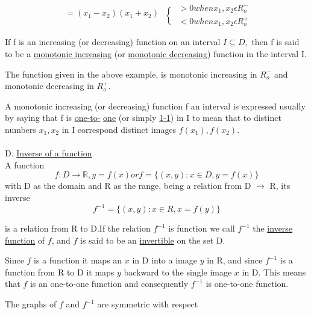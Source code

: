 \documentclass[11pt]{amsbook}
\begin{document}
\[ \left. \begin{array}{ll}
=(x_{1}-x_{2})(x_{1}+x_{2})\\
\end{array} \right \{
\begin{array}{ll}
>0   when  x_{1}, x_{2}\epsilon R_{o}^{-}\\

<0 when x_{1}, x_{2}\epsilon R_{o}^{+}
\end{array} \]

If f is an increasing (or decreasing) function on an  interval $I\subseteq D,$ then f is said to be a \underline{monotonic increasing} (or \underline{monotonic decreasing}) function in the interval I.


The function given in the above example, is monotonic increasing in $R_{o}^{-}$ and monotonic decreasing in $R_{o}^{+}$.


A monotonic increasing (or decreasing) function f an interval is expressed usually by saying that f is \underline{one-to-} \underline{one} (or simply \underline{1-1}) in I to mean that to distinct numbers $x_{1},x_{2}$ in I correspond distinct images $f(x_{1}), f(x_{2})$.\\
\\

D. \underline{Inverse of a function}\\

A function
\begin{equation}
f:D \rightarrow \mathbb{R}, y=f(x) or f=\{(x,y): x \in D, y=f(x)\} 
\end{equation}
with D as the domain and R as the range, being a relation from D $\rightarrow$ R, its inverse
\begin{equation}
f^{-1} = \{(x,y): x \in R, x=f(y)\}
\end{equation}

is a relation from R to D.If the relation $f^{-1}$ is function we call $f^{-1}$ the \underline{inverse function} of $f$, and $f$ is said to be an \underline{invertible} on the set D.

Since $f$ is a function it maps an $x$ in D into a image $y$ in R, and since $f^{-1}$ is a function from R to D it maps $y$ backward to the single image $x$ in D. This means that $f$ is an one-to-one function and consequently $f^{-1}$ is one-to-one function.
 
 The graphs of $f$ and $f^{-1}$ are symmetric with respect\\
\end{document}
